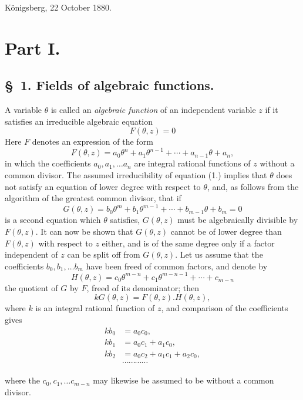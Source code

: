 \documentclass{article}
\begin{document}
Königsberg, 22 October 1880.

\section*{Part I.}

\subsection*{§~1. Fields of algebraic functions.}

A variable $\theta$ is called an \emph{algebraic function} of an independent variable $z$ if it satisfies an irreducible algebraic equation
\[ F(\theta, z) = 0 \tag{1.} \]
Here $F$ denotes an expression of the form
\[ F(\theta, z) = a_{0}\theta^{n} + a_{1}\theta^{n-1} + \cdots + a_{n-1}\theta + a_{n}, \]
in which the coefficients $a_{0}, a_{1}, \ldots a_{n}$ are integral rational functions of $z$ without a common divisor. The assumed irreducibility of equation (1.) implies that $\theta$ does not satisfy an equation of lower degree with respect to $\theta$, and, as follows from the algorithm of the greatest common divisor, that if
\[ G(\theta, z) = b_{0}\theta^{m} + b_{1}\theta^{m-1} + \cdots + b_{m-1}\theta + b_{m} = 0 \]
is a second equation which $\theta$ satisfies, $G(\theta, z)$ must be algebraically divisible by $F(\theta, z)$. It can now be shown that $G(\theta, z)$ cannot be of lower degree than $F(\theta, z)$ with respect to $z$ either, and is of the same degree only if a factor independent of $z$ can be split off from $G(\theta, z)$. Let us assume that the coefficients $b_{0}, b_{1}, \ldots b_{m}$ have been freed of common factors, and denote by
\[ H(\theta, z) = c_{0}\theta^{m-n} + c_{1}\theta^{m-n-1} + \cdots + c_{m-n} \]
the quotient of $G$ by $F$, freed of its denominator; then
\[ kG(\theta, z) = F(\theta, z).H(\theta, z), \]
where $k$ is an integral rational function of $z$, and comparison of the coefficients gives
\[ \begin{aligned} kb_{0} &= a_{0}c_{0}, \\ kb_{1} &= a_{0}c_{1} + a_{1}c_{0}, \\ kb_{2} &= a_{0}c_{2} + a_{1}c_{1} + a_{2}c_{0}, \\ &\cdots\cdots\cdots\cdots \end{aligned} \]

where the $c_{0}, c_{1}, \ldots c_{m-n}$ may likewise be assumed to be without a common divisor.
\end{document}
